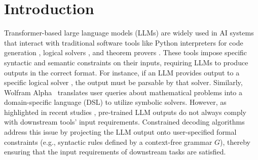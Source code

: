 \section{Introduction}
\label{sec:intro}
Transformer-based large language models (LLMs) are widely used in AI systems that interact with traditional software tools like Python interpreters \cite{openai_tools, programofThoughts} 
{}{for code generation \cite{cornstack,code-watermark,surveycode}}, logical solvers \cite{pan2023logiclmempoweringlargelanguage, Olausson_2023}, and theorem provers \cite{wu2022autoformalization, yang2023leandojotheoremprovingretrievalaugmented}. These tools impose specific syntactic and semantic constraints on their inputs, requiring LLMs to produce outputs in the correct format. For instance, if an LLM provides output to a specific logical solver \cite{han2024FOLIOnaturallanguagereasoning}, the output must be parsable by that solver. Similarly, Wolfram Alpha~\cite{Wolfram} translates user queries about mathematical problems into a domain-specific language (DSL) to utilize symbolic solvers. However, as highlighted in recent studies \cite{syncode, guidance, poesia2022synchromesh}, pre-trained LLM outputs do not always comply with downstream tools' input requirements. Constrained decoding algorithms \cite{syncode, poesia2022synchromesh} address this issue by projecting the LLM output onto user-specified formal constraints (e.g., syntactic rules defined by a context-free grammar $G$), thereby ensuring that the input requirements of downstream tasks are satisfied.  

